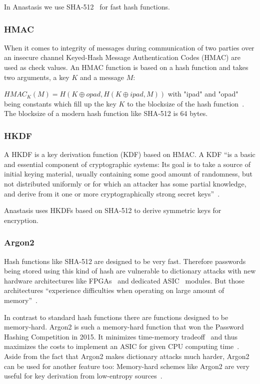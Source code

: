 In Anastasis we use SHA-512~\cite{GJW2011} for fast hash functions.

\subsubsection{HMAC}

When it comes to integrity of messages during communication of two
parties over an insecure channel Keyed-Hash Message Authentication
Codes (HMAC) are used as check values. An HMAC function is based on a
hash function and takes two arguments, a key $K$ and a message $M$:

$HMAC_{K}(M) = H(K \oplus opad,H(K \oplus ipad, M))$ with "ipad" and
"opad" being constants which fill up the key $K$ to the blocksize of
the hash function~\cite{BCK1996}. The blocksize of a modern hash
function like SHA-512 is 64 bytes.

\subsubsection{HKDF}

A HKDF is a key derivation function (KDF) based on HMAC. A KDF ``is a
basic and essential component of cryptographic systems: Its goal is
to take a source of initial keying material, usually containing some
good amount of randomness, but not distributed uniformly or for which
an attacker has some partial knowledge, and derive from it one or more
cryptographically strong secret keys''~\cite{krawczyk2010}.

Anastasis uses HKDFs based on SHA-512 to derive symmetric keys for
encryption.

\subsubsection{Argon2}

Hash functions like SHA-512 are designed to be very fast. Therefore
passwords being stored using this kind of hash are vulnerable to
dictionary attacks with new hardware architectures like
FPGAs~\cite{trimberger2012} and dedicated ASIC~\cite{madurawe2006}
modules. But those architectures ``experience difficulties when
operating on large amount of memory''~\cite{BDK2016}.

In contrast to standard hash functions there are functions designed to
be memory-hard. Argon2 is such a memory-hard function that won the
Password Hashing Competition in 2015. It minimizes time-memory
tradeoff~\cite{stamp2003} and thus maximizes the costs to implement an
ASIC for given CPU computing time~\cite{BDK2016}. Aside from the fact
that Argon2 makes dictionary attacks much harder, Argon2 can be used
for another feature too: Memory-hard schemes like Argon2 are very
useful for key derivation from low-entropy sources~\cite{BDK2016}.

